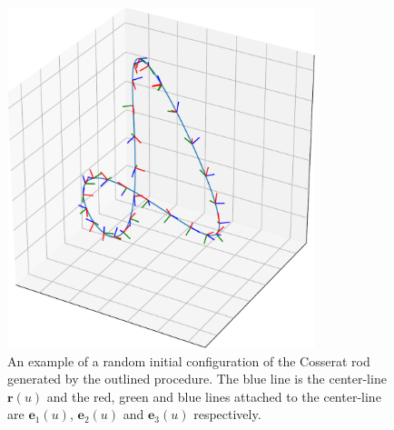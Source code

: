\documentclass[withindex,glossary,techreport]{cam-thesis}
\begin{document}
\begin{appendices}
\begin{figure}[t]
\centering
        \includegraphics[width=0.8\textwidth]{figs_part2/benchmark_simulations/example_intial_rod_config}
        \caption{An example of a random initial configuration of the Cosserat rod generated by the outlined procedure. The blue line is the center-line $\mathbf{r}(u)$ and the red, green and blue lines attached to the center-line are $\mathbf{e}_1(u)$, $\mathbf{e}_2(u)$ and $\mathbf{e}_3(u)$ respectively.}
        \label{fig:example random initial cosserat configuration}
\end{figure}


\end{appendices}
\end{document}
